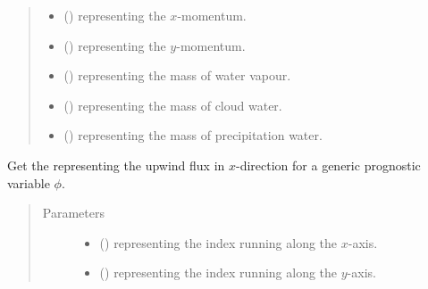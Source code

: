 \documentclass[letterpaper,10pt,english]{sphinxmanual}
\begin{document}
\begin{fulllineitems}
\begin{fulllineitems}
\begin{quote}
\begin{description}
\begin{itemize}
\item {} 
 () \textendash{}  representing the \(x\)-momentum.

\item {} 
 () \textendash{}  representing the \(y\)-momentum.

\item {} 
 () \textendash{}  representing the mass of water vapour.

\item {} 
 () \textendash{}  representing the mass of cloud water.

\item {} 
 () \textendash{}  representing the mass of precipitation water.

\end{itemize}

\end{description}\end{quote}

\end{fulllineitems}


\begin{fulllineitems}
\label{\detokenize{api:dycore.flux_isentropic.FluxIsentropicUpwind._get_upwind_flux_x}}
Get the  representing the upwind flux in \(x\)-direction for a generic
prognostic variable \(\phi\).
\begin{quote}\begin{description}
\item[{Parameters}] \leavevmode\begin{itemize}
\item {} 
 () \textendash{}  representing the index running along the \(x\)-axis.

\item {} 
 () \textendash{}  representing the index running along the \(y\)-axis.


\end{itemize}
\end{description}
\end{quote}
\end{fulllineitems}
\end{fulllineitems}
\end{document}
